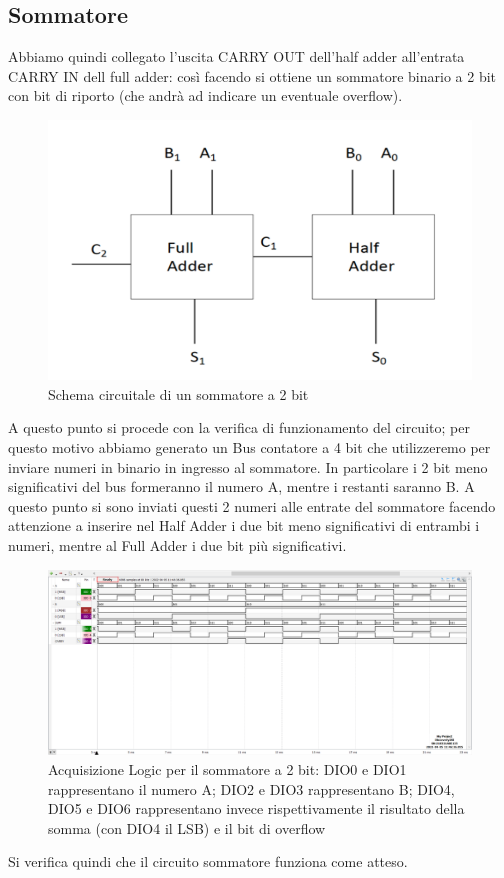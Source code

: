 \documentclass[10pt, a4paper, italian]{article}
\begin{document}
\subsection{Sommatore}
Abbiamo quindi collegato l'uscita CARRY OUT  dell'half adder all'entrata CARRY IN dell full adder: così facendo si ottiene un sommatore binario a 2 bit con bit di riporto (che andrà ad indicare un eventuale overflow).
\begin{figure}[htbp]
    \centering
    \includegraphics[width=0.6\linewidth]{sum.png}
    \caption{Schema circuitale di un sommatore a 2 bit}
    \label{fig: sommatore}
\end{figure}

A questo punto si procede con la verifica di funzionamento del circuito; per questo motivo abbiamo generato un Bus contatore a 4 bit che utilizzeremo per inviare numeri in binario in ingresso al sommatore.
In particolare i 2 bit meno significativi del bus formeranno il numero A, mentre i restanti saranno B.
A questo punto si sono inviati questi 2 numeri alle entrate del sommatore facendo attenzione a inserire nel Half Adder i due bit meno significativi di entrambi i numeri, mentre al Full Adder i due bit più significativi.

\begin{figure}[htbp]
    \centering
    \includegraphics[width=\linewidth]{sum_time.png}
    \caption{Acquisizione Logic per il sommatore a 2 bit: DIO0 e DIO1 rappresentano il numero A; DIO2 e DIO3 rappresentano B; DIO4, DIO5 e DIO6 rappresentano invece rispettivamente il risultato della somma (con DIO4 il LSB) e il bit di overflow}
    \label{fig: faAD2}
\end{figure}
Si verifica quindi che il circuito sommatore funziona come atteso.
\end{document}
